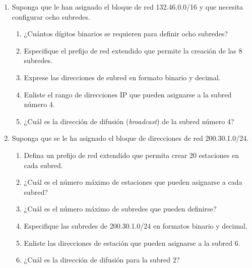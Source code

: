 \begin{enumerate}
    \item Suponga que le han asignado el bloque de red 132.46.0.0/16 y que necesita configurar ocho subredes.
    \begin{enumerate}
        \item ¿Cu\'antos d\'igitos binarios se requieren para definir ocho subredes?
        \item Especifique el prefijo de red extendido que permite la creaci\'on de las 8 subredes.
        \item Exprese las direcciones de subred en formato binario y decimal.
        \item Enliste el rango de direcciones IP que pueden asignarse a la subred n\'umero 4.
        \item ¿Cu\'al es la direcci\'on de difusi\'on (\textit{broadcast}) de la subred n\'umero 4?
    \end{enumerate}

    \item Suponga que se le ha asignado el bloque de direcciones de red 200.30.1.0/24.
    \begin{enumerate}
        \item Defina un prefijo de red extendido que permita crear 20 estaciones en cada subred.
        \item ¿Cu\'al es el n\'umero m\'aximo de estaciones que pueden asignarse a cada subred?
        \item ¿Cu\'al es el n\'umero m\'aximo de subredes que pueden definirse?
        \item Especifique las subredes de 200.30.1.0/24 en formatos binario y decimal.
        \item Enliste las direcciones de estaci\'on que pueden asignarse a la subred 6.
        \item ¿Cu\'al es la direcci\'on de difusi\'on para la subred 2?
    \end{enumerate}


\end{enumerate}

